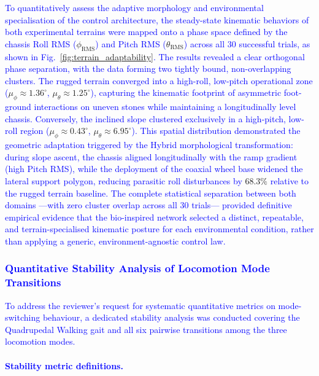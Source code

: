 \documentclass[preprint,12pt]{elsarticle}
\newcommand{\revblue}[1]{\textcolor{blue}{#1}}
\begin{document}
\revblue{To quantitatively assess the adaptive morphology and environmental specialisation of the control architecture, the steady-state kinematic behaviors of both experimental terrains were mapped onto a phase space defined by the chassis Roll RMS (}$\phi_{\text{RMS}}$\revblue{) and Pitch RMS (}$\theta_{\text{RMS}}$\revblue{) across all 30 successful trials, as shown in Fig.}~\ref{fig:terrain_adaptability}\revblue{. The results revealed a clear orthogonal phase separation, with the data forming two tightly bound, non-overlapping clusters. The rugged terrain converged into a high-roll, low-pitch operational zone (}$\mu_{\phi} \approx 1.36^{\circ}$\revblue{,} $\mu_{\theta} \approx 1.25^{\circ}$\revblue{), capturing the kinematic footprint of asymmetric foot-ground interactions on uneven stones while maintaining a longitudinally level chassis. Conversely, the inclined slope clustered exclusively in a high-pitch, low-roll region (}$\mu_{\phi} \approx 0.43^{\circ}$\revblue{,} $\mu_{\theta} \approx 6.95^{\circ}$\revblue{). This spatial distribution demonstrated the geometric adaptation triggered by the Hybrid morphological transformation: during slope ascent, the chassis aligned longitudinally with the ramp gradient (high Pitch RMS), while the deployment of the coaxial wheel base widened the lateral support polygon, reducing parasitic roll disturbances by} $68.3\%$ \revblue{relative to the rugged terrain baseline. The complete statistical separation between both domains ---with zero cluster overlap across all 30 trials--- provided definitive empirical evidence that the bio-inspired network selected a distinct, repeatable, and terrain-specialised kinematic posture for each environmental condition, rather than applying a generic, environment-agnostic control law.}

\subsubsection{\revblue{Quantitative Stability Analysis of Locomotion Mode Transitions}}
\label{sssec:transition_stability}

\revblue{%
To address the reviewer's request for systematic quantitative metrics
on mode-switching behaviour, a dedicated stability analysis was
conducted covering the Quadrupedal Walking gait and all six pairwise transitions
among the three locomotion modes.
}

\paragraph{\revblue{Stability metric definitions.}}
\end{document}
